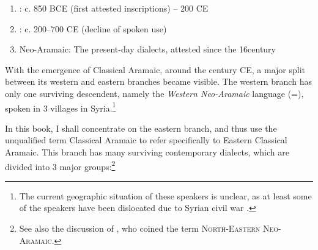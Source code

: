 \begin{enumerate}
\item {}: c. 850 BCE (first attested inscriptions) -- 200 CE 
\item {}: c. 200--700 CE (decline of spoken use) 
\item Neo-Aramaic: The present-day dialects, attested since the 16\th century 
\end{enumerate}

With the emergence of {Classical Aramaic}, around the \second century CE, a major split between its western and eastern branches became visible. The western branch  has only one surviving descendent, namely the \textit{Western Neo-Aramaic} language (=\WNA), spoken in 3 villages in Syria.\footnote{The current geographic situation of these speakers is unclear, as at least some of the speakers have been dislocated due to Syrian civil war \citep[see][]{GutmanForgetting}.}

In this book, I shall concentrate on the eastern branch, and thus use the unqualified term {Classical Aramaic} to refer specifically to Eastern {Classical Aramaic}. This branch has many surviving contemporary dialects, which are divided into 3 major groups:\footnote{See also the discussion of \citet[557, fn.\ 2]{Hoberman1988history}, who coined the term \textsc{North-Eastern Neo-Aramaic}.}
 

